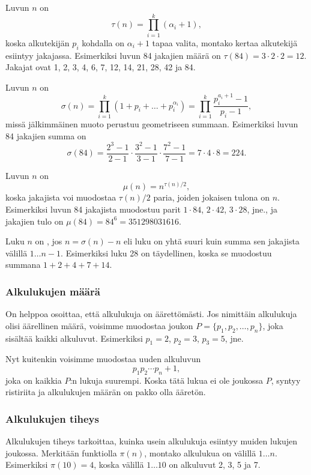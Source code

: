 Luvun $n$  on
\[\tau(n)=\prod_{i=1}^k (\alpha_i+1),\]
koska alkutekijän $p_i$ kohdalla on $\alpha_i+1$
tapaa valita, montako kertaa alkutekijä
esiintyy jakajassa.
Esimerkiksi luvun 84 jakajien määrä
on $\tau(84)=3 \cdot 2 \cdot 2 = 12$.
Jakajat ovat
1, 2, 3, 4, 6, 7, 12, 14, 21, 28, 42 ja 84.

Luvun $n$  on
\[\sigma(n)=\prod_{i=1}^k (1+p_i+\ldots+p_i^{\alpha_i}) = \prod_{i=1}^k \frac{p_i^{a_i+1}-1}{p_i-1},\]
missä jälkimmäinen muoto perustuu geometriseen summaan.
Esimerkiksi luvun 84 jakajien summa on
\[\sigma(84)=\frac{2^3-1}{2-1} \cdot \frac{3^2-1}{3-1} \cdot \frac{7^2-1}{7-1} = 7 \cdot 4 \cdot 8 = 224.\]

Luvun $n$  on
\[\mu(n)=n^{\tau(n)/2},\]
koska jakajista voi muodostaa
$\tau(n)/2$ paria, joiden jokaisen tulona on $n$.
Esimerkiksi luvun 84 jakajista muodostuu parit
$1 \cdot 84$, $2 \cdot 42$, $3 \cdot 28$, jne.,
ja jakajien tulo on $\mu(84)=84^6=351298031616$.


Luku $n$ on , jos $n=\sigma(n)-n$
eli luku on yhtä suuri kuin summa sen jakajista
välillä $1 \ldots n-1$.
Esimerkiksi luku 28 on täydellinen, koska
se muodostuu summana $1+2+4+7+14$.

\subsubsection{Alkulukujen määrä}

On helppoa osoittaa, että alkulukuja on äärettömästi.
Jos nimittäin alkulukuja olisi äärellinen määrä,
voisimme muodostaa joukon $P=\{p_1,p_2,\ldots,p_n\}$,
joka sisältää kaikki alkuluvut.
Esimerkiksi $p_1=2$, $p_2=3$, $p_3=5$, jne.

Nyt kuitenkin voisimme muodostaa uuden alkuluvun
\[p_1 p_2 \cdots p_n+1,\]
joka on kaikkia $P$:n lukuja suurempi.
Koska tätä lukua ei ole joukossa $P$,
syntyy ristiriita ja alkulukujen määrän on
pakko olla ääretön.

\subsubsection{Alkulukujen tiheys}

Alkulukujen tiheys tarkoittaa, kuinka usein alkulukuja
esiintyy muiden lukujen joukossa.
Merkitään funktiolla $\pi(n)$, 
montako alkulukua on välillä $1 \ldots n$.
Esimerkiksi $\pi(10)=4$, koska välillä $1 \ldots 10$
on alkuluvut 2, 3, 5 ja 7.

